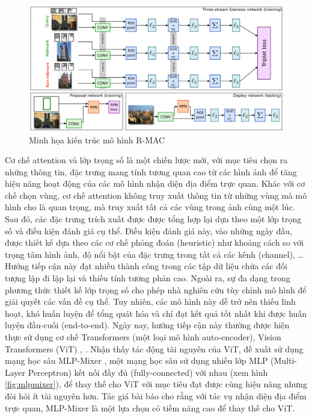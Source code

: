 \begin{figure}[h]
    \centering
    \includegraphics[width=\textwidth]{pics/Chapter2/rmac.png}
    \caption{Minh họa kiến trúc mô hình R-MAC \cite{tolias2015particular}}
    \label{fig:rmac}
\end{figure}

Cơ chế attention và lớp trọng số là một chiến lược mới, với mục tiêu chọn ra những thông tin, đặc trưng mang tính tương quan cao từ các hình ảnh để tăng hiệu năng hoạt động của các mô hình nhận diện địa điểm trực quan. Khác với cơ chế chọn vùng, cơ chế attention không truy xuất thông tin từ những vùng mà mô hình cho là quan trọng, mà truy xuất tất cả các vùng trong ảnh cùng một lúc. Sau đó, các đặc trưng trích xuất được được tổng hợp lại dựa theo một lớp trọng số và điều kiện đánh giá cụ thể. Điều kiện đánh giá này, vào những ngày đầu, được thiết kế dựa theo các cơ chế phỏng đoán (heuristic) như khoảng cách so với trọng tâm hình ảnh, độ nổi bật của đặc trưng trong tất cả các kênh (channel), \dots Hướng tiếp cận này đạt nhiều thành công trong các tập dữ liệu chứa các đối tượng lặp đi lặp lại và thiếu tính tương phản cao. Ngoài ra, sự đa dạng trong phương thức thiết kế lớp trọng số cho phép nhà nghiên cứu tùy chỉnh mô hình để giải quyết các vấn đề cụ thể. Tuy nhiên, các mô hình này dễ trở nên thiếu linh hoạt, khó huấn luyện để tổng quát hóa và chỉ đạt kết quả tốt nhất khi được huấn luyện đầu-cuối (end-to-end). Ngày nay, hướng tiếp cận này thường được hiện thực sử dụng cơ chế Transformers (một loại mô hình auto-encoder), Vision Transformers (ViT) \cite{dosovitskiy2020image}, \cite{shavit2023coarse}. Nhận thấy tác động tài nguyên của ViT, \cite{alibey2023mixvpr} đề xuất sử dụng mạng học sâu MLP-Mixer \cite{tolstikhin2021mlpmixer}, một mạng học sâu sử dụng nhiều lớp MLP (Multi-Layer Perceptron) kết nối đầy đủ (fully-connected) với nhau (xem hình \ref{fig:mlpmixer}), để thay thế cho ViT với mục tiêu đạt được cùng hiệu năng nhưng đòi hỏi ít tài nguyên hơn. Tác giá bài báo \cite{alibey2023mixvpr} cho rằng với tác vụ nhận diện địa điểm trực quan, MLP-Mixer là một lựa chọn có tiềm năng cao để thay thế cho ViT.

